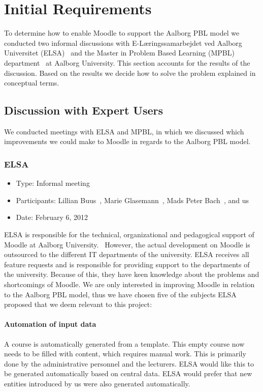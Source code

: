 \chapter{Initial Requirements}
\label{sec:initialAnalysis}
To determine how to enable Moodle to support the Aalborg PBL model we conducted two informal discussions with E-L\ae{}ringssamarbejdet ved Aalborg Universitet (ELSA)~\cite{elsa} and the Master in Problem Based Learning (MPBL) department~\cite{mpbl} at Aalborg University.
This section accounts for the results of the discussion.
Based on the results we decide how to solve the problem explained in conceptual terms.

\section{Discussion with Expert Users}  
\label{sub:expertUsers} 
We conducted meetings with ELSA and MPBL, in which we discussed which improvements we could make to Moodle in regards to the Aalborg PBL model.

\subsection{ELSA}
\label{sub:elsaInterview}
\begin{itemize}
	\item Type: Informal meeting
	\item Participants: Lillian Buus~\cite{lillian}, Marie Glasemann~\cite{marie}, Mads Peter Bach~\cite{mads}, and us 
	\item Date: February 6, 2012
\end{itemize}
ELSA is responsible for the technical, organizational and pedagogical support of Moodle at Aalborg University.~\cite{elsa} 
However, the actual development on Moodle is outsourced to the different IT departments of the university. 
ELSA receives all feature requests and is responsible for providing support to the departments of the university.
Because of this, they have keen knowledge about the problems and shortcomings of Moodle. 
We are only interested in improving Moodle in relation to the Aalborg PBL model, thus we have chosen five of the subjects ELSA proposed that we deem relevant to this project:

\subsubsection{Automation of input data}
A course is automatically generated from a template. 
This empty course now needs to be filled with content, which requires manual work. 
This is primarily done by the administrative personnel and the lecturers. 
ELSA would like this to be generated automatically based on central data. 
ELSA would prefer that new entities introduced by us were also generated automatically.

